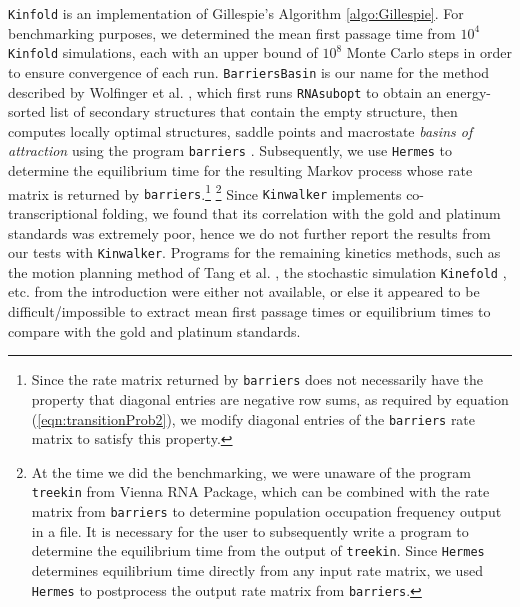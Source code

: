{\tt Kinfold} \cite{flamm} is an implementation of Gillespie's
Algorithm \ref{algo:Gillespie}.
For benchmarking purposes, we determined the mean first passage time
from $10^4$ {\tt Kinfold} simulations, each with an upper bound of
$10^8$ Monte Carlo steps in order to ensure convergence of each run.
{\tt BarriersBasin} is our name for the method described by Wolfinger
et al. \cite{wolfingerStadler:kinetics}, which first runs
{\tt RNAsubopt} \cite{flammHofacker} to obtain an energy-sorted list of
secondary structures that contain the empty structure,
then computes locally optimal structures, saddle points and macrostate
{\em basins of attraction}  using the program {\tt barriers}
\cite{wolfingerStadler:kinetics}. Subsequently, we use {\tt Hermes} to
determine the equilibrium time for the resulting Markov process whose
rate matrix is returned by {\tt barriers}.\footnote{Since
the rate matrix returned by {\tt barriers}
does not necessarily have the property that diagonal entries are negative
row sums, as required by equation (\ref{eqn:transitionProb2}), we modify
diagonal entries of the {\tt barriers} rate matrix to satisfy this property.}
\footnote{At the time we did the benchmarking, we were unaware of the
program {\tt treekin} from Vienna RNA Package, which can be combined with
the rate matrix from {\tt barriers} to determine population occupation
frequency output in a file. It is necessary for the user to subsequently
write a program to determine the equilibrium time from the output of
{\tt treekin}. Since {\tt Hermes} determines equilibrium time directly
from any input rate matrix, we used {\tt Hermes} to postprocess the
output rate matrix from {\tt barriers}.}
Since {\tt Kinwalker} \cite{Geis.jmb08} implements co-transcriptional folding,
we found that its correlation with the gold and platinum standards was
extremely poor, hence we do not further report the results from our tests
with {\tt Kinwalker}.
Programs for the remaining kinetics methods, such as the motion planning
method of Tang et al. \cite{Tang.jmb08}, the stochastic simulation
{\tt Kinefold} \cite{Xayaphoummine.nar05}, etc.
from the introduction were either not available, or else it
appeared to be difficult/impossible to extract
mean first passage times or equilibrium times to compare with the
gold and platinum standards.


